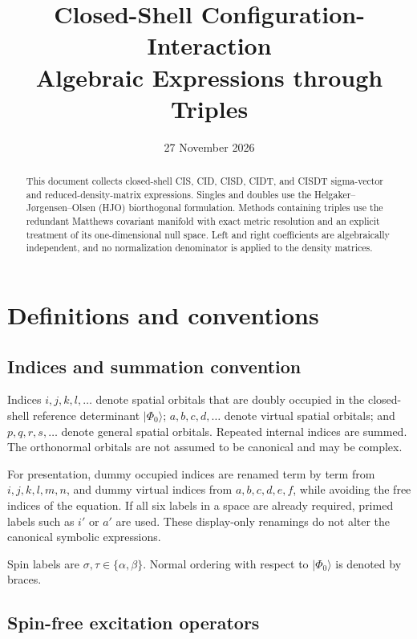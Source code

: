 \documentclass[10pt]{article}
\title{Closed-Shell Configuration-Interaction\\
       Algebraic Expressions through Triples}
\author{}
\date{27 November 2026}
\numberwithin{equation}{section}
\newcommand{\vac}{\Phi_0}
\begin{document}
\maketitle
\begin{abstract}
This document collects closed-shell CIS, CID, CISD, CIDT, and CISDT
sigma-vector and reduced-density-matrix expressions.  Singles and doubles
use the Helgaker--J\o rgensen--Olsen (HJO) biorthogonal formulation.  Methods
containing triples use the redundant Matthews covariant manifold with exact
metric resolution and an explicit treatment of its one-dimensional null
space.  Left and right coefficients are algebraically independent, and no
normalization denominator is applied to the density matrices.
\end{abstract}

\begingroup
\small
\setlength{\parskip}{0pt}
\tableofcontents
\endgroup

\clearpage
\section{Definitions and conventions}

\subsection{Indices and summation convention}

Indices $i,j,k,l,\ldots$ denote spatial orbitals that are doubly occupied in
the closed-shell reference determinant $\lvert\vac\rangle$;
$a,b,c,d,\ldots$ denote virtual spatial orbitals; and
$p,q,r,s,\ldots$ denote general spatial orbitals.  Repeated internal indices
are summed.  The orthonormal orbitals are not assumed to be canonical and may
be complex.

For presentation, dummy occupied indices are renamed term by term from
$i,j,k,l,m,n$, and dummy virtual indices from $a,b,c,d,e,f$, while avoiding
the free indices of the equation.  If all six labels in a space are already
required, primed labels such as $i'$ or $a'$ are used.  These display-only
renamings do not alter the canonical symbolic expressions.

Spin labels are $\sigma,\tau\in\{\alpha,\beta\}$.  Normal ordering with
respect to $\lvert\vac\rangle$ is denoted by braces.

\subsection{Spin-free excitation operators}
\end{document}

